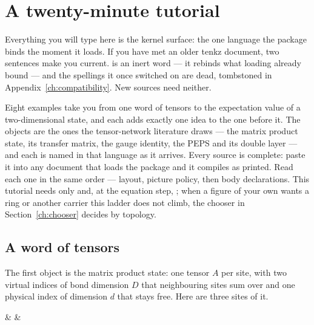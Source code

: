 \section{A twenty-minute tutorial}\label{ch:tutorial}

Everything you will type here is the kernel surface: the one language the
package binds the moment it loads.  If you have met an older tenkz
document, two sentences make you current.   is an inert
word --- it rebinds what loading already bound --- and the spellings it
once switched on are dead, tombstoned in Appendix~\ref{ch:compatibility}.
New sources need neither.

Eight examples take you from one word of tensors to the expectation value
of a two-dimensional state, and each adds exactly one idea to the one
before it.  The objects are the ones the tensor-network literature draws
--- the matrix product state, its transfer matrix, the gauge identity,
the PEPS and its double layer --- and each is named in that language as
it arrives.  Every source is complete: paste it into any document that
loads the package and it compiles as printed.  Read each one in the same
order --- layout, picture policy, then body declarations.  This tutorial
needs only  and, at the equation step, ; when
a figure of your own wants a ring or another carrier this ladder does not
climb, the chooser in Section~\ref{ch:chooser} decides by topology.

\subsection{A word of tensors}

The first object is the matrix product state: one tensor $A$ per site,
with two virtual indices of bond dimension $D$ that neighbouring sites
sum over and one physical index of dimension $d$ that stays free.  Here
are three sites of it.

\begin{tnexample}[
  label={tnex:tut-word},
  formula={(A^{i_1}A^{i_2}A^{i_3})_{\alpha\beta}},
  caption={three sites of a matrix product state},
  index={The horizontal bonds are summed virtual indices.  The two stubs
    are the open matrix indices $\alpha$ and $\beta$; each upward leg is
    one physical index.},
  signature={kernel-boundary|signature=open:e, open:w, phys:n, phys:n, phys:n}]
\begin{tenkz}[cols=3]
   &
   &
\end{tenkz}
\end{tnexample}


